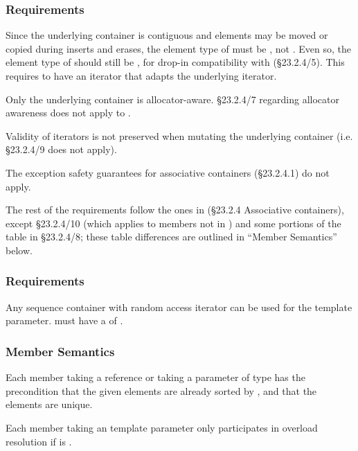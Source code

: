 \subsubsection{ Requirements}

Since the underlying container is contiguous and elements may be moved or
copied during inserts and erases, the element type of  must be
, not .  Even so, the element type
of  should still be , for drop-in
compatibility with  (\S23.2.4/5).  This requires  to
have an iterator that adapts the underlying  iterator.

Only the underlying container is allocator-aware.  \S23.2.4/7 regarding
allocator awareness does not apply to .

Validity of iterators is not preserved when mutating the underlying container
(i.e. \S23.2.4/9 does not apply).

The exception safety guarantees for associative containers (\S23.2.4.1) do not
apply.

The rest of the requirements follow the ones in (\S23.2.4 Associative
containers), except \S23.2.4/10 (which applies to members not in
) and some portions of the table in \S23.2.4/8; these table
differences are outlined in ``Member Semantics'' below.

\subsubsection{ Requirements}

Any sequence container with random access iterator can be used for the
 template parameter.   must have a
 of .

\subsubsection{Member Semantics}

Each member taking a  reference or taking a parameter of type
 has the precondition that the given
elements are already sorted by , and that the elements are
unique.

Each member taking an  template parameter only participates in
overload resolution if  is
.

